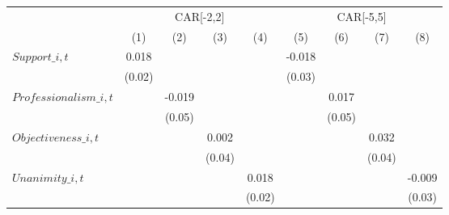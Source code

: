 {
\def\sym#1{\ifmmode^{#1}\else\(^{#1}\)\fi}
\begin{tabular}{l*{8}{c}}
\toprule
                    &\multicolumn{4}{c}{CAR[-2,2]}                                                          &\multicolumn{4}{c}{CAR[-5,5]}                                                          \\\cmidrule(lr){2-5}\cmidrule(lr){6-9}
                    &\multicolumn{1}{c}{(1)}         &\multicolumn{1}{c}{(2)}         &\multicolumn{1}{c}{(3)}         &\multicolumn{1}{c}{(4)}         &\multicolumn{1}{c}{(5)}         &\multicolumn{1}{c}{(6)}         &\multicolumn{1}{c}{(7)}         &\multicolumn{1}{c}{(8)}         \\
\midrule
$\textit{Support}\_{i,t}$&       0.018         &                     &                     &                     &      -0.018         &                     &                     &                     \\
                    &      (0.02)         &                     &                     &                     &      (0.03)         &                     &                     &                     \\
$\textit{Professionalism}\_{i,t}$&                     &      -0.019         &                     &                     &                     &       0.017         &                     &                     \\
                    &                     &      (0.05)         &                     &                     &                     &      (0.05)         &                     &                     \\
$\textit{Objectiveness}\_{i,t}$&                     &                     &       0.002         &                     &                     &                     &       0.032         &                     \\
                    &                     &                     &      (0.04)         &                     &                     &                     &      (0.04)         &                     \\
$\textit{Unanimity}\_{i,t}$&                     &                     &                     &       0.018         &                     &                     &                     &      -0.009         \\
                    &                     &                     &                     &      (0.02)         &                     &                     &                     &      (0.03)         \\

\end{tabular}}
